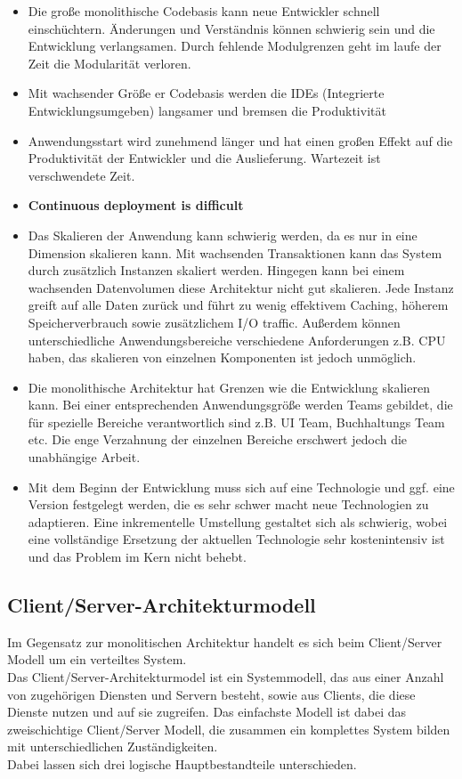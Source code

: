 	\begin{itemize}
	\item Die große monolithische Codebasis kann neue Entwickler schnell einschüchtern. Änderungen und Verständnis können schwierig sein und die Entwicklung verlangsamen. Durch fehlende Modulgrenzen geht im laufe der Zeit die Modularität verloren.
	\item Mit wachsender Größe er Codebasis werden die IDEs (Integrierte Entwicklungsumgeben) langsamer und bremsen die Produktivität
	\item Anwendungsstart wird zunehmend länger und hat einen großen Effekt auf die Produktivität der Entwickler und die Auslieferung. Wartezeit ist verschwendete Zeit.
	\item \textbf{Continuous deployment is difficult }
	\item Das Skalieren der Anwendung kann schwierig werden, da es nur in eine Dimension skalieren kann. Mit wachsenden Transaktionen kann das System durch zusätzlich Instanzen skaliert werden. Hingegen kann bei einem wachsenden Datenvolumen diese Architektur nicht gut skalieren. Jede Instanz greift auf alle Daten zurück und führt zu wenig effektivem Caching, höherem Speicherverbrauch sowie zusätzlichem I/O traffic. Außerdem können unterschiedliche Anwendungsbereiche verschiedene Anforderungen z.B. CPU haben, das skalieren von einzelnen Komponenten ist jedoch unmöglich.
	\item Die monolithische Architektur hat Grenzen wie die Entwicklung skalieren kann. Bei einer entsprechenden Anwendungsgröße werden Teams gebildet, die für spezielle Bereiche verantwortlich sind z.B. UI Team, Buchhaltungs Team etc.
	Die enge Verzahnung der einzelnen Bereiche erschwert jedoch die unabhängige Arbeit.
	\item Mit dem Beginn der Entwicklung muss sich auf eine Technologie und ggf. eine Version festgelegt werden, die es sehr schwer macht neue Technologien zu adaptieren. Eine inkrementelle Umstellung gestaltet sich als schwierig, wobei eine vollständige Ersetzung der aktuellen Technologie sehr kostenintensiv ist und das Problem im Kern nicht behebt.
	\end{itemize}
	\cite*[vgl. ][]{Richardson.2014}
	
	\subsection{Client/Server-Architekturmodell}
	Im Gegensatz zur monolitischen Architektur handelt es sich beim Client/Server Modell um ein verteiltes System.\\
	Das Client/Server-Architekturmodel ist ein Systemmodell, das aus einer Anzahl von zugehörigen Diensten und Servern besteht, sowie aus Clients, die diese Dienste nutzen und auf sie zugreifen. Das einfachste Modell ist dabei das zweischichtige Client/Server Modell, die zusammen ein komplettes System bilden mit unterschiedlichen Zuständigkeiten. \\
	Dabei lassen sich drei logische Hauptbestandteile unterschieden.
	
